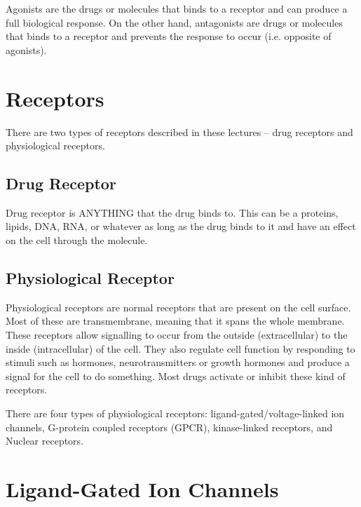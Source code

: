 Agonists are the drugs or molecules that binds to a receptor and can produce a full biological response.
On the other hand, antagonists are drugs or molecules that binds to a receptor and prevents the response to occur (i.e. opposite of agonists).

\section{Receptors}

There are two types of receptors described in these lectures -- drug receptors and physiological receptors.

\subsection{Drug Receptor}

Drug receptor is ANYTHING that the drug binds to.
This can be a proteins, lipids, DNA, RNA, or whatever as long as the drug binds to it and have an effect on the cell through the molecule.

\subsection{Physiological Receptor}

\begin{center}
\end{center}

Physiological receptors are normal receptors that are present on the cell surface.
Most of these are transmembrane, meaning that it spans the whole membrane.
These receptors allow signalling to occur from the outside (extracellular) to the inside (intracellular) of the cell.
They also regulate cell function by responding to stimuli such as hormones, neurotransmitters or growth hormones and produce a signal for the cell to do something.
Most drugs activate or inhibit these kind of receptors.

There are four types of physiological receptors: ligand-gated/voltage-linked ion channels, G-protein coupled receptors (GPCR), kinase-linked receptors, and Nuclear receptors.

\begin{center}
\end{center}

\section{Ligand-Gated Ion Channels}

